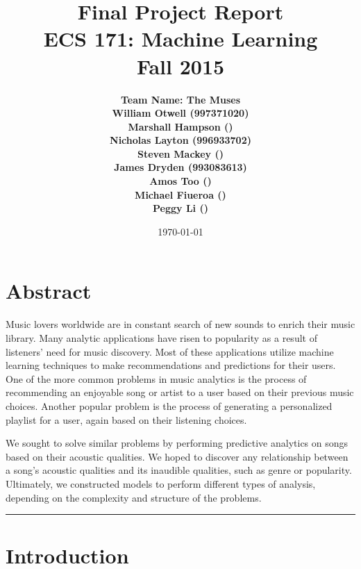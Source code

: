 \documentclass[12pt]{article}
\title{\vspace{-3ex}\bf Final Project Report\\[2ex] 
       \normalsize ECS 171: Machine Learning\\Fall 2015}
\date{\today}
\author{\bf Team Name: The Muses\\ \bf William Otwell (997371020)\\ \bf Marshall Hampson ()\\ \bf Nicholas Layton (996933702)\\ \bf Steven Mackey ()\\ \bf James Dryden (993083613)\\ \bf Amos Too ()\\ \bf Michael Fiueroa ()\\ \bf Peggy Li ()}
\newcommand{\horizontalLine}{
	\begin{center}
		\hrule width 1.0\textwidth
	\end{center}
}
\begin{document}
\maketitle
\pagebreak
\tableofcontents
\pagebreak

\section{Abstract}
\label{sec:abstract}
Music lovers worldwide are in constant search of new sounds to enrich their music library. Many analytic applications have risen to popularity as a result of listeners' need for music discovery. Most of these applications utilize machine learning techniques to make recommendations and predictions for their users. One of the more common problems in music analytics is the process of recommending an enjoyable song or artist to a user based on their previous music choices. Another popular problem is the process of generating a personalized playlist for a user, again based on their listening choices. 

We sought to solve similar problems by performing predictive analytics on songs based on their acoustic qualities. We hoped to discover any relationship between a song's acoustic qualities and its inaudible qualities, such as genre or popularity. Ultimately, we constructed models to perform different types of analysis, depending on the complexity and structure of the problems. 

\horizontalLine
\section{Introduction}
\label{sec:introduction}
\end{document}

